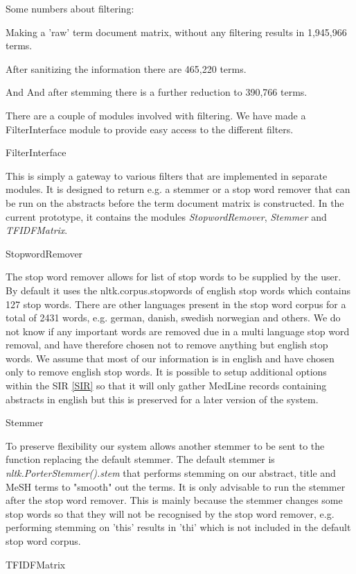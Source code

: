 Some numbers about filtering:

Making a 'raw' term document matrix, without any filtering results in
1,945,966 terms.

After sanitizing the information there are 465,220 terms.

And And after stemming there is a further reduction to 390,766 terms.

There are a couple of modules involved with filtering. We have made a
FilterInterface module to provide easy access to the different
filters.

FilterInterface

This is simply a gateway to various filters that are implemented in
separate modules. It is designed to return e.g. a stemmer or a stop
word remover that can be run on the abstracts before the term document
matrix is constructed. In the current prototype, it contains the
modules \textit{StopwordRemover}, \textit{Stemmer} and
\textit{TFIDFMatrix}.

StopwordRemover

The stop word remover allows for list of stop words to be supplied by
the user. By default it uses the nltk.corpus.stopwords of english stop
words which contains 127 stop words. There are other languages present
in the stop word corpus for a total of 2431 words, e.g. german,
danish, swedish norwegian and others. We do not know if any important
words are removed due in a multi language stop word removal, and have
therefore chosen not to remove anything but english stop words. We
assume that most of our information is in english and have chosen only
to remove english stop words. It is possible to setup additional
options within the SIR \ref{SIR} so that it will only gather MedLine
records containing abstracts in english but this is preserved for a
later version of the system.

Stemmer

To preserve flexibility our system allows another stemmer to be sent
to the function replacing the default stemmer. The default stemmer is
\textit{nltk.PorterStemmer().stem} that performs stemming on our
abstract, title and MeSH terms to "smooth" out the terms. It is only
advisable to run the stemmer after the stop word remover. This is
mainly because the stemmer changes some stop words so that they will
not be recognised by the stop word remover, e.g. performing stemming
on 'this' results in 'thi' which is not included in the default stop
word corpus.

TFIDFMatrix

